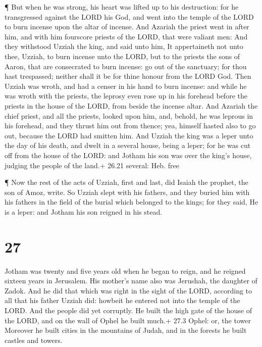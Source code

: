  ¶ But when he was strong, his heart was lifted up to his
destruction: for he transgressed against the LORD his God, and went into
the temple of the LORD to burn incense upon the altar of incense.
 And Azariah the priest went in after him, and with him
fourscore priests of the LORD, that were valiant men:  And
they withstood Uzziah the king, and said unto him, It appertaineth not
unto thee, Uzziah, to burn incense unto the LORD, but to the priests the
sons of Aaron, that are consecrated to burn incense: go out of the
sanctuary; for thou hast trespassed; neither shall it be for thine
honour from the LORD God.  Then Uzziah was wroth, and had a
censer in his hand to burn incense: and while he was wroth with the
priests, the leprosy even rose up in his forehead before the priests in
the house of the LORD, from beside the incense altar.  And
Azariah the chief priest, and all the priests, looked upon him, and,
behold, he was leprous in his forehead, and they thrust him out from
thence; yea, himself hasted also to go out, because the LORD had smitten
him.  And Uzziah the king was a leper unto the day of his
death, and dwelt in a several house, being a leper; for he was cut off
from the house of the LORD: and Jotham his son was over the king's
house, judging the people of the land.+ 26.21 several: Heb. free

 ¶ Now the rest of the acts of Uzziah, first and last, did
Isaiah the prophet, the son of Amoz, write.  So Uzziah
slept with his fathers, and they buried him with his fathers in the
field of the burial which belonged to the kings; for they said, He is a
leper: and Jotham his son reigned in his stead.

\hypertarget{section-26}{%
\section{27}\label{section-26}}

 Jotham was twenty and five years old when he began to
reign, and he reigned sixteen years in Jerusalem. His mother's name also
was Jerushah, the daughter of Zadok.  And he did that which
was right in the sight of the LORD, according to all that his father
Uzziah did: howbeit he entered not into the temple of the LORD. And the
people did yet corruptly.  He built the high gate of the
house of the LORD, and on the wall of Ophel he built much.+ 27.3 Ophel:
or, the tower  Moreover he built cities in the mountains of
Judah, and in the forests he built castles and towers.

